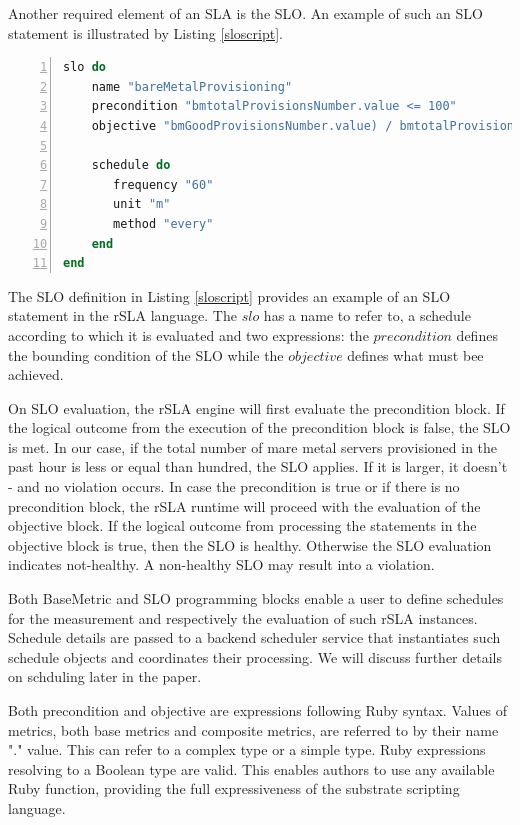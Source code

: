 Another required element of an SLA is the SLO. An example of such an SLO statement is illustrated by Listing \ref{sloscript}.

\begin{minipage}{1.0\textwidth}
\begin{lstlisting}[language=Ruby, basicstyle=\small\normalfont\sffamily, breaklines=true,  captionpos=b, mathescape=true, caption=rSLA SLO creation script, label=sloscript, numbers=left, numbersep=5pt, numberstyle=\tiny] 
slo do
    name "bareMetalProvisioning"
    precondition "bmtotalProvisionsNumber.value <= 100"
    objective "bmGoodProvisionsNumber.value) / bmtotalProvisionsNumber.value >= 0.9"

    schedule do
       frequency "60"
       unit "m"
       method "every"
    end
end 
\end{lstlisting}
\end{minipage}

The SLO definition in Listing \ref{sloscript} provides an example of an SLO statement in the rSLA language. The $slo$ has a name to refer to, a schedule according to which it is evaluated and two expressions: the $precondition$ defines the bounding condition of the SLO while the $objective$ defines what must bee achieved.

On SLO evaluation, the rSLA engine will first evaluate the precondition block. If the logical outcome from the execution of the precondition block is false, the SLO is met. In our case, if the total number of mare metal servers provisioned in the past hour is less or equal than hundred, the SLO applies. If it is larger, it doesn't - and no violation occurs. In case the precondition is true or if there is no precondition block, the rSLA runtime will proceed with the evaluation of the objective block. If the logical outcome from processing the statements in the objective block is true, then the SLO is healthy. Otherwise the SLO evaluation indicates not-healthy. A non-healthy SLO may result into a violation. 

Both BaseMetric and SLO programming blocks enable a  user to define schedules for the measurement and respectively the evaluation of such rSLA instances. Schedule details are passed to a backend scheduler service that instantiates such schedule objects and coordinates their processing. We will discuss further details on schduling later in the paper.

Both precondition and objective are expressions following Ruby syntax. Values of metrics, both base metrics and composite metrics, are referred to by their name "." value. This can refer to a complex type or a simple type. Ruby expressions resolving to a Boolean type are valid. This enables authors to use any available Ruby function, providing the full expressiveness of the substrate scripting language.  

